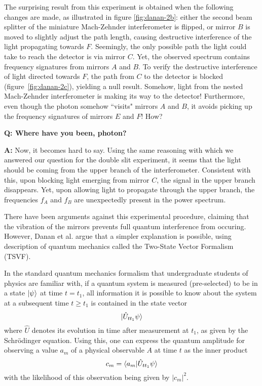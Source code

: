 \documentclass{article}
\newcommand{\Q}{\bfseries Q: }
\newcommand{\A}{\par\textbf{A:} \normalfont}
\begin{document}
The surprising result from this experiment is obtained when the following 
changes are made, as illustrated in figure \ref{fig:danan-2b}:
either the second beam splitter of the miniature Mach-Zehnder interferometer is 
flipped, or mirror $B$ is moved to slightly adjust the path length, causing 
destructive interference of the light propagating towards $F$\cite{danan}.  
Seemingly, the only possible path the light could take to reach the detector is 
via mirror $C$. Yet, the observed spectrum contains frequency signatures from 
mirrors $A$ and $B$. To verify the destructive interference of light directed 
towards $F$, the path from $C$ to the detector is blocked 
(figure~\ref{fig:danan-2c}), yielding a null result. Somehow, light from the 
nested Mach-Zehnder interferometer is making its way to the detector!  
Furthermore, even though the photon somehow ``visits" mirrors $A$ and $B$, it 
avoids picking up the frequency signatures of mirrors $E$ and $F$! How? 

\begin{framed}

	\Q Where have you been, photon?  

	\A Now, it becomes hard to say. Using the same reasoning with which we 
	answered our question for the double slit experiment, it seems that the 
	light should be coming from the upper branch of the interferometer.  
	Consistent with this, upon blocking light emerging from mirror $C$, the 
	signal in the upper branch disappears. Yet, upon allowing light to 
	propagate through the upper branch, the frequencies $f_A$ and $f_B$ are 
	unexpectedly present in the power spectrum.

\end{framed}

There have been arguments against this experimental procedure, claiming that 
the vibration of the mirrors prevents full quantum interference from 
occuring\cite{comment,past}.  However, Danan et al. argue that a simpler 
explanation is possible, using description of quantum mechanics called the 
Two-State Vector Formalism (TSVF)\cite{danan,aharonov2008}. 

In the standard quantum mechanics formalism that undergraduate students of 
physics are familiar with, if a quantum system is measured (pre-selected) to be 
in a state $\ket \psi$ at time $t = t_1$, all information it is possible to 
know about the system at a subsequent time $t \geq t_1$ is contained in the 
state vector $$\ket{\hat U_{t t_1}\psi}$$ where $\hat U$ denotes its evolution 
in time after measurement at $t_1$, as given by the Schrödinger 
equation\cite{aharonov2008}.  Using this, one can express the quantum amplitude 
for observing a value $a_m$ of a physical observable $A$ at time $t$ as the 
inner product $$c_m = \braket{a_m|\hat U_{t t_1}\psi}$$ with the likelihood of 
this observation being given by ${|c_m|}^2$. 
\end{document}
